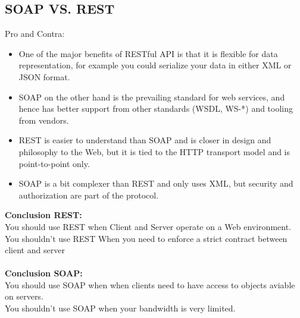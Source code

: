 \documentclass[12pt]{article}
\begin{document}
\subsection{SOAP VS. REST}
Pro and Contra:\\ 
\begin{itemize}
\item One of the major benefits of RESTful API is that it is flexible for data representation, for example you could serialize your data in either XML or JSON format.
\item SOAP on the other hand is the prevailing standard for web services, and hence has better support from other standards (WSDL, WS-*) and tooling from vendors.
\item REST is easier to understand than SOAP and is closer in design and philosophy to the Web, but it is tied to the HTTP transport model and is point-to-point only.
\item SOAP is a bit complexer than REST and only uses XML, but security and authorization are part of the protocol.
\end{itemize}
\textbf{Conclusion REST:}\\
You should use REST when Client and Server operate on a Web environment.\\
You shouldn't use REST When you need to enforce a strict contract between client and server\\
\\\textbf{Conclusion SOAP:}\\
You should use SOAP when when clients need to have access to objects aviable on servers.\\
You shouldn't use SOAP when your bandwidth is very limited. \newpage
\end{document}
